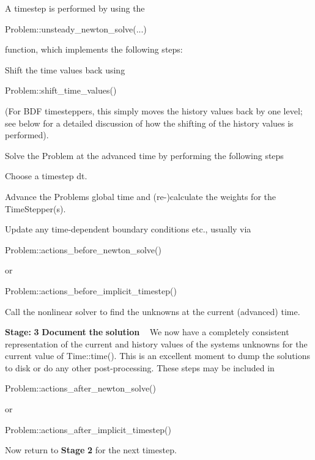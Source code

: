 \begin{DoxyItemize}
 A timestep is performed by using the 
\begin{DoxyCode}
Problem::unsteady\_newton\_solve(...) 
\end{DoxyCode}
 function, which implements the following steps\+:
\begin{DoxyEnumerate}
\item Shift the time values back using 
\begin{DoxyCode}
Problem::shift\_time\_values() 
\end{DoxyCode}
 (For B\+DF timesteppers, this simply moves the history values back by one level; see below for a detailed discussion of how the shifting of the history values is performed).
\item Solve the {\ttfamily Problem} at the advanced time by performing the following steps
\begin{DoxyEnumerate}
\item Choose a timestep {\ttfamily dt}.
\item Advance the {\ttfamily Problem\textquotesingle{}s} global time and (re-\/)calculate the weights for the {\ttfamily Time\+Stepper(s)}.
\item Update any time-\/dependent boundary conditions etc., usually via
\begin{DoxyCode}
Problem::actions\_before\_newton\_solve() 
\end{DoxyCode}
 or
\begin{DoxyCode}
Problem::actions\_before\_implicit\_timestep()
\end{DoxyCode}

\item Call the nonlinear solver to find the unknowns at the current (advanced) time.
\end{DoxyEnumerate}
\end{DoxyEnumerate}
\item {\bfseries Stage\+:} {\bfseries 3} {\bfseries Document} {\bfseries the} {\bfseries solution} ~\newline
 We now have a completely consistent representation of the current and history values of the system\textquotesingle{}s unknowns for the current value of {\ttfamily Time\+::time()}. This is an excellent moment to dump the solutions to disk or do any other post-\/processing. These steps may be included in
\begin{DoxyCode}
Problem::actions\_after\_newton\_solve() 
\end{DoxyCode}
 or
\begin{DoxyCode}
Problem::actions\_after\_implicit\_timestep() 
\end{DoxyCode}

\item Now return to {\bfseries Stage} {\bfseries 2} for the next timestep.
\end{DoxyItemize}

